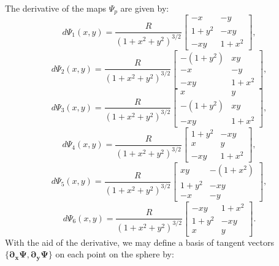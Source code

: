 The derivative of the maps $\Psi_p$ are given by:
\begin{equation*}
	d\Psi_{1}(x,y) = \frac{R}{{(1 + x^2 + y^2)}^{3/2}}
	\begin{bmatrix}
		-x & -y \\
	 	 1+y^2  & -xy \\
		 -xy  & 1+x^2
	\end{bmatrix},
\end{equation*}
\begin{equation*}
	d\Psi_{2}(x,y) = \frac{R}{{(1 + x^2 + y^2)}^{3/2}}
	\begin{bmatrix}
		-(1+y^2) & xy \\
		 -x &  -y \\
		 -xy &  1+x^2
	\end{bmatrix},
\end{equation*}
\begin{equation*}
	d\Psi_{3}(x,y) = \frac{R}{{(1 + x^2 + y^2)}^{3/2}}
	\begin{bmatrix}
		 x &  y \\
		-(1+y^2) & xy \\
		 -xy &  1+x^2
	\end{bmatrix},
\end{equation*}
\begin{equation*}
	d\Psi_{4}(x,y) = \frac{R}{{(1 + x^2 + y^2)}^{3/2}}	
	\begin{bmatrix}
		 1+y^2 &  -xy \\
		 x & y \\
		 -xy &  1+x^2
	\end{bmatrix},
\end{equation*}
\begin{equation*}
	d\Psi_{5}(x,y) = \frac{R}{{(1 + x^2 + y^2)}^{3/2}}	
	\begin{bmatrix}
		 xy  & -(1+x^2) \\
	 	 1+y^2  &  -xy \\
		-x & -y
	\end{bmatrix},
\end{equation*}
\begin{equation*}
	d\Psi_{6}(x,y) = \frac{R}{{(1 + x^2 + y^2)}^{3/2}}
	\begin{bmatrix}
		 -xy  &  1+x^2 \\
		 1+y^2  &  -xy \\
		 x &  y
	\end{bmatrix}.
\end{equation*}
With the aid of the derivative, we may define a basis of tangent vectors 
$\{\boldsymbol{\partial_x \Psi},  \boldsymbol{\partial_y \Psi}\}$ on each point on the sphere by:
